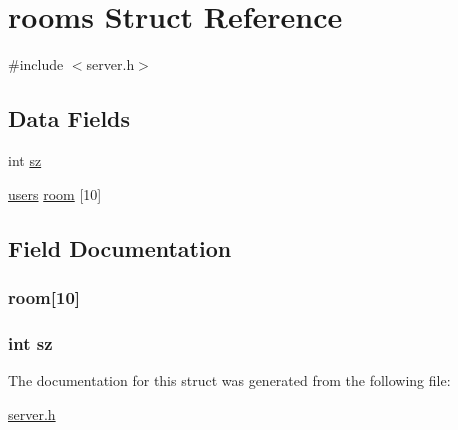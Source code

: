 \hypertarget{structrooms}{\section{rooms Struct Reference}
\label{structrooms}
}


{\ttfamily \#include $<$server.\+h$>$}

\subsection*{Data Fields}
\begin{DoxyCompactItemize}
\item 
int \hyperlink{structrooms_a0e1ea19fb9fa7881d15d84eff4c090e1}{sz}
\item 
\hyperlink{structusers}{users} \hyperlink{structrooms_ab73c5d746a54537c786ff9e85761d46d}{room} \mbox{[}10\mbox{]}
\end{DoxyCompactItemize}


\subsection{Field Documentation}
\hypertarget{structrooms_ab73c5d746a54537c786ff9e85761d46d}{
\subsubsection[{room}]{ room\mbox{[}10\mbox{]}}}\label{structrooms_ab73c5d746a54537c786ff9e85761d46d}
\hypertarget{structrooms_a0e1ea19fb9fa7881d15d84eff4c090e1}{
\subsubsection[{sz}]{\setlength{\rightskip}{0pt plus 5cm}int sz}}\label{structrooms_a0e1ea19fb9fa7881d15d84eff4c090e1}


The documentation for this struct was generated from the following file\+:\begin{DoxyCompactItemize}
\item 
\hyperlink{server_8h}{server.\+h}\end{DoxyCompactItemize}
